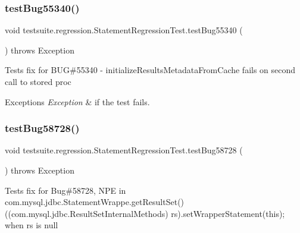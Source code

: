 \subsubsection{\texorpdfstring{test\+Bug55340()}{testBug55340()}}
{\footnotesize\ttfamily void testsuite.\+regression.\+Statement\+Regression\+Test.\+test\+Bug55340 (\begin{DoxyParamCaption}{ }\end{DoxyParamCaption}) throws Exception}

Tests fix for B\+UG\#55340 -\/ initialize\+Results\+Metadata\+From\+Cache fails on second call to stored proc


\begin{DoxyExceptions}{Exceptions}
{\em Exception} & if the test fails. \\
\hline
\end{DoxyExceptions}
\mbox{\label{classtestsuite_1_1regression_1_1_statement_regression_test_a84dc5a1748d9651df8f09ae7b8e2fd2b}} 
\subsubsection{\texorpdfstring{test\+Bug58728()}{testBug58728()}}
{\footnotesize\ttfamily void testsuite.\+regression.\+Statement\+Regression\+Test.\+test\+Bug58728 (\begin{DoxyParamCaption}{ }\end{DoxyParamCaption}) throws Exception}

Tests fix for Bug\#58728, N\+PE in com.\+mysql.\+jdbc.\+Statement\+Wrappe.\+get\+Result\+Set() ((com.\+mysql.\+jdbc.\+Result\+Set\+Internal\+Methods) rs).set\+Wrapper\+Statement(this); when rs is null \mbox{\label{classtestsuite_1_1regression_1_1_statement_regression_test_add450cdadfb025367a53db78024a96e6}} 
